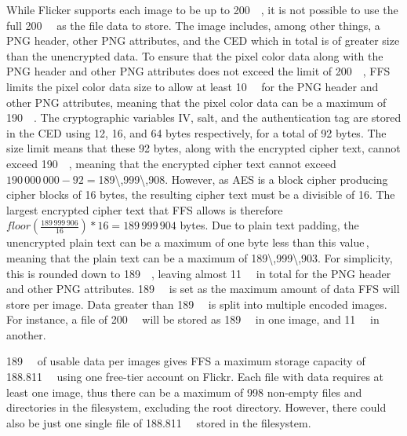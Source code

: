 While Flicker supports each image to be up to \SI{200}{\mega\byte}, it is not possible to use the full \SI{200}{\mega\byte} as the file data to store. The image includes, among other things, a PNG header, other PNG attributes, and the CED which in total is of greater size than the unencrypted data. To ensure that the pixel color data along with the PNG header and other PNG attributes does not exceed the limit of \SI{200}{\mega\byte}, FFS limits the pixel color data size to allow at least \SI{10}{\mega\byte} for the PNG header and other PNG attributes, meaning that the pixel color data can be a maximum of \SI{190}{\mega\byte}. The cryptographic variables IV, salt, and the authentication tag are stored in the CED using 12, 16, and 64 bytes respectively, for a total of 92 bytes. The size limit means that these 92 bytes, along with the encrypted cipher text, cannot exceed \SI{190}{\mega\byte}, meaning that the encrypted cipher text cannot exceed $190\,000\,000 - 92 = $\SI{189\,999\,908}{\byte}. However, as AES is a block cipher producing cipher blocks of 16 bytes, the resulting cipher text must be a divisible of 16. The largest encrypted cipher text that FFS allows is therefore $floor(\frac{189\,999\,906}{16})*16 = 189\,999\,904$ bytes. Due to plain text padding, the unencrypted plain text can be a maximum of one byte less than this value\,\cite{z.z.coderAnswerSizeData2010}, meaning that the plain text can be a maximum of \SI{189\,999\,903}{\byte}. For simplicity, this is rounded down to \SI{189}{\mega\byte}, leaving almost \SI{11}{\mega\byte} in total for the PNG header and other PNG attributes. \SI{189}{\mega\byte} is set as the maximum amount of data FFS will store per image. Data greater than \SI{189}{\mega\byte} is split into multiple encoded images. For instance, a file of \SI{200}{\mega\byte} will be stored as \SI{189}{\mega\byte} in one image, and \SI{11}{\mega\byte} in another. 

\SI{189}{\mega\byte} of usable data per images gives FFS a maximum storage capacity of \SI{188.811}{\giga\byte} using one free-tier account on Flickr. Each file with data requires at least one image, thus there can be a maximum of 998 non-empty files and directories in the filesystem, excluding the root directory. However, there could also be just one single file of \SI{188.811}{\giga\byte} stored in the filesystem.

